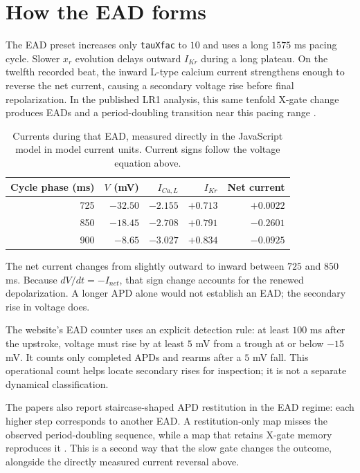 \documentclass[11pt]{article}
\begin{document}
\section{How the EAD forms}

The EAD preset increases only \texttt{tauXfac} to $10$ and uses a long $1575$ ms pacing cycle. Slower $x_r$ evolution delays outward $I_{Kr}$ during a long plateau. On the twelfth recorded beat, the inward L-type calcium current strengthens enough to reverse the net current, causing a secondary voltage rise before final repolarization. In the published LR1 analysis, this same tenfold X-gate change produces EADs and a period-doubling transition near this pacing range \cite{landaw2017,landaw2018}.

\begin{table}[H]
\centering
\caption{Currents during that EAD, measured directly in the JavaScript model in model current units. Current signs follow the voltage equation above.}
\begin{tabular}{rrrrr}
\toprule
Cycle phase (ms) & $V$ (mV) & $I_{Ca,L}$ & $I_{Kr}$ & Net current \\
\midrule
725 & $-32.50$ & $-2.155$ & $+0.713$ & $+0.0022$ \\
850 & $-18.45$ & $-2.708$ & $+0.791$ & $-0.2601$ \\
900 & $-8.65$ & $-3.027$ & $+0.834$ & $-0.0925$ \\
\bottomrule
\end{tabular}
\end{table}

The net current changes from slightly outward to inward between $725$ and $850$ ms. Because $dV/dt=-I_{net}$, that sign change accounts for the renewed depolarization. A longer APD alone would not establish an EAD; the secondary rise in voltage does.

The website's EAD counter uses an explicit detection rule: at least $100$ ms after the upstroke, voltage must rise by at least $5$ mV from a trough at or below $-15$ mV. It counts only completed APDs and rearms after a $5$ mV fall. This operational count helps locate secondary rises for inspection; it is not a separate dynamical classification.

The papers also report staircase-shaped APD restitution in the EAD regime: each higher step corresponds to another EAD. A restitution-only map misses the observed period-doubling sequence, while a map that retains X-gate memory reproduces it \cite{landaw2017,landaw2018}. This is a second way that the slow gate changes the outcome, alongside the directly measured current reversal above.
\end{document}
